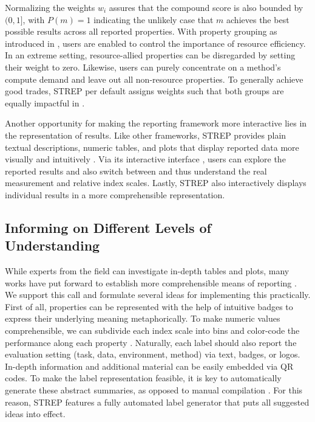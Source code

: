 \documentclass[sn-mathphys,Numbered]{sn-jnl}%
\theoremstyle{thmstylethree}%
\begin{document}
Normalizing the weights $w_i$ assures that the compound score is also bounded by $(0, 1]$, with $P(m)=1$ indicating the unlikely case that $m$ achieves the best possible results across all reported properties.
With property grouping as introduced in , users are enabled to control the importance of resource efficiency.
In an extreme setting, resource-allied properties can be disregarded by setting their weight to zero.
Likewise, users can purely concentrate on a method's compute demand and leave out all non-resource properties.
To generally achieve good trades, STREP per default assigns weights such that both groups are equally impactful in .

Another opportunity for making the reporting framework more interactive lies in the representation of results.
Like other frameworks, STREP provides plain textual descriptions, numeric tables, and plots that display reported data more visually and intuitively \cite{cui_visual_2019}.
Via its interactive interface \cite{dabbas_interactive_2021}, users can explore the reported results and also switch between and thus understand the real measurement and relative index scales.
Lastly, STREP also interactively displays individual results in a more comprehensible representation.

\subsection{Informing on Different Levels of Understanding}
\label{sec:meth:automated_labeling}

While experts from the field can investigate in-depth tables and plots, many works have put forward to establish more comprehensible means of reporting \cite{yeswecare}.
We support this call and formulate several ideas for implementing this practically.
First of all, properties can be represented with the help of intuitive badges \cite{yeswecare} to express their underlying meaning metaphorically.
To make numeric values comprehensible, we can subdivide each index scale into bins and color-code the performance along each property \cite{Assessing_Energy_Efficiency_of_ML}.
Naturally, each label should also report the evaluation setting (task, data, environment, method) via text, badges, or logos.
In-depth information and additional material can be easily embedded via QR codes.
To make the label representation feasible, it is key to automatically generate these abstract summaries, as opposed to manual compilation \cite{arnold2019factsheets,Mitchell/etal/2019a}.
For this reason, STREP features a fully automated label generator that puts all suggested ideas into effect.
\end{document}

